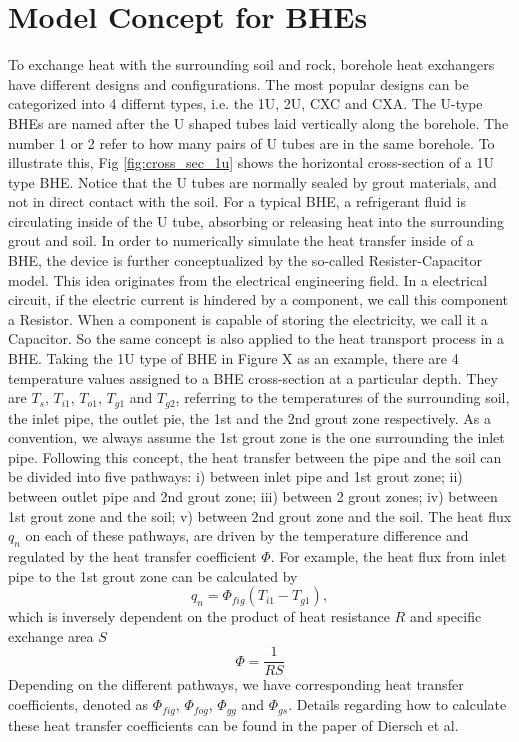 \section{Model Concept for BHEs}
To exchange heat with the surrounding soil and rock, borehole heat exchangers have different designs and configurations. The most popular designs can be categorized into 4 differnt types, i.e. the 1U, 2U, CXC and CXA. The U-type BHEs are named after the U shaped tubes laid vertically along the borehole. The number 1 or 2 refer to how many pairs of U tubes are in the same borehole. To illustrate this, Fig \ref{fig:cross_sec_1u} shows the horizontal cross-section of a 1U type BHE. Notice that the U tubes are normally sealed by grout materials, and not in direct contact with the soil. For a typical BHE, a refrigerant fluid is circulating inside of the U tube, absorbing or releasing heat into the surrounding grout and soil. 
In order to numerically simulate the heat transfer inside of a BHE, the device is further conceptualized by the so-called Resister-Capacitor model. This idea originates from the electrical engineering field. In a electrical circuit, if the electric current is hindered by a component, we call this component a Resistor. When a component is capable of storing the electricity, we call it a Capacitor. So the same concept is also applied to the heat transport process in a BHE. Taking the 1U type of BHE in Figure X as an example, there are 4 temperature values assigned to a BHE cross-section at a particular depth. They are $T_s$, $T_{i1}$, $T_{o1}$, $T_{g1}$ and $T_{g2}$, referring to the temperatures of the surrounding soil, the inlet pipe, the outlet pie, the 1st and the 2nd grout zone respectively. As a convention, we always assume the 1st grout zone is the one surrounding the inlet pipe. Following this concept, the heat transfer between the pipe and the soil can be divided into five pathways: i) between inlet pipe and 1st grout zone; ii) between outlet pipe and 2nd grout zone; iii) between 2 grout zones; iv) between 1st grout zone and the soil; v) between 2nd grout zone and the soil. The heat flux $q_n$ on each of these pathways, are driven by the temperature difference and regulated by the heat transfer coefficient $\Phi$. For example, the heat flux from inlet pipe to the 1st grout zone can be calculated by 
\begin{equation}
\label{eqn:heat_transfer}
q_n = \Phi_{fig} \left( T_{i1} - T_{g1} \right), 
\end{equation} 
which is inversely dependent on the product of heat resistance $R$ and specific exchange area $S$
\begin{equation}
\Phi = \frac{1}{R S}
\end{equation}
Depending on the different pathways, we have corresponding heat transfer coefficients, denoted as $\Phi_{fig}$, $\Phi_{fog}$, $\Phi_{gg}$ and $\Phi_{gs}$. Details regarding how to calculate these heat transfer coefficients can be found in the paper of Diersch et al\cite{Diersch2011a}.  
~~\
